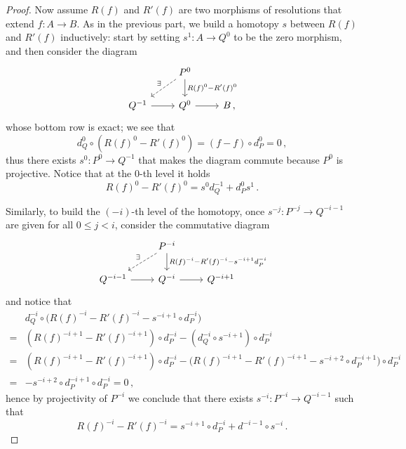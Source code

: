 \begin{prop}
\begin{proof}
    Now assume $R(f)$ and $R'(f)$ are two morphisms of resolutions
    that extend $f:A \to B$. As in the previous part,
    we build a homotopy $s$ between $R(f)$ and $R'(f)$ inductively:
    start by setting $s^{1} : A \to Q^{0}$ to be the zero morphism,
    and then consider the diagram
        \begin{equation*}
            \begin{tikzcd}
                & P^{0} \ar[d, "R(f)^{0}-R'(f)^{0}"] \ar[dl, dashed, "\exists"']
                & \\
                Q^{-1} \ar[r] & Q^{0} \ar[r] & B \,,
            \end{tikzcd}
        \end{equation*}
    whose bottom row is exact; we see that
    \begin{equation*}
       d_{Q}^{0} \circ (R(f)^{0}-R'(f)^{0}) 
       = (f - f) \circ d^{0}_{P} = 0\,, 
    \end{equation*}
    thus there exists $s^{0}: P^{0} \to Q^{-1}$ that
    makes the diagram commute because $P^{0}$ is projective.
    Notice that at the $0$-th level it holds
    \begin{equation*}
        R(f)^{0}-R'(f)^{0} = s^{0}d^{-1}_{Q} + d^{0}_{P} s^{1}\,.
    \end{equation*}

    Similarly, to build the $(-i)$-th level of the homotopy,
    once $s^{-j}:P^{-j} \to Q^{-i-1}$ are given for all $0 \le j <i$,
    consider the commutative diagram
    \begin{equation*}
            \begin{tikzcd}
                & P^{-i} \ar[d, "R(f)^{-i}-R'(f)^{-i}-s^{-i+1}d_{P}^{-i}"] 
                \ar[dl, dashed, "\exists"']
                & \\
                Q^{-i-1} \ar[r] & Q^{-i} \ar[r] & Q^{-i+1} \,
            \end{tikzcd}
        \end{equation*}
    and notice that
    \begin{align*}
        & d^{-i}_{Q} \circ \big( R(f)^{-i}-R'(f)^{-i}-s^{-i+1} \circ d_{P}^{-i} \big) \\
        =& (R(f)^{-i+1}-R'(f)^{-i+1}) \circ d^{-i}_{P} - (d^{-i}_{Q} \circ s^{-i+1}) \circ d_{P}^{-i}\\
        =& (R(f)^{-i+1}-R'(f)^{-i+1}) \circ d^{-i}_{P}
        - \big( R(f)^{-i+1}-R'(f)^{-i+1} - s^{-i+2} \circ d^{-i+1}_{P} \big) 
        \circ d_{P}^{-i} \\
        =& - s^{-i+2} \circ d^{-i+1}_{P} \circ d_{P}^{-i} = 0\,,
    \end{align*}
    hence by projectivity of $P^{-i}$ we conclude that 
    there exists $s^{-i}:P^{-i} \to Q^{-i-1}$ such that
    \begin{equation*}
        R(f)^{-i}-R'(f)^{-i} = s^{-i+1} \circ d^{-i}_{P} + d^{-i-1} \circ s^{-i}\,.
    \end{equation*}
    \end{proof}
\end{prop}

